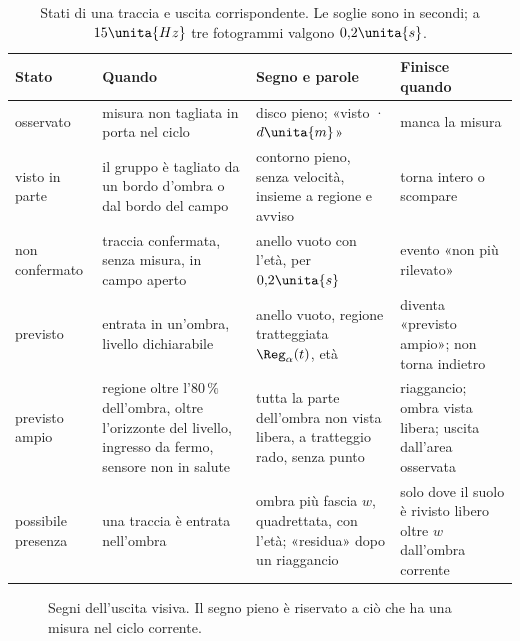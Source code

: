 \begin{table}[H]\centering\small
\caption{Stati di una traccia e uscita corrispondente. Le soglie sono in secondi; a $15\unita{Hz}$ tre fotogrammi valgono $0{,}2\unita{s}$.}\label{tab:lim-stati}
\begin{tabularx}{\linewidth}{@{}p{2.5cm}Lp{4.6cm}L@{}}
\toprule
Stato & Quando & Segno e parole & Finisce quando\\
\midrule
osservato & misura non tagliata in porta nel ciclo & disco pieno; «visto · $d\unita{m}$» & manca la misura\\
visto in parte & il gruppo è tagliato da un bordo d'ombra o dal bordo del campo & contorno pieno, senza velocità, insieme a regione e avviso & torna intero o scompare\\
non confermato & traccia confermata, senza misura, in campo aperto & anello vuoto con l'età, per $0{,}2\unita{s}$ & evento «non più rilevato»\\
previsto & entrata in un'ombra, livello dichiarabile & anello vuoto, regione tratteggiata $\Reg_\alpha(t)$, età & diventa «previsto ampio»; non torna indietro\\
previsto ampio & regione oltre l'$80\,\%$ dell'ombra, oltre l'orizzonte del livello, ingresso da fermo, sensore non in salute & tutta la parte dell'ombra non vista libera, a tratteggio rado, senza punto & riaggancio; ombra vista libera; uscita dall'area osservata\\
possibile presenza & una traccia è entrata nell'ombra & ombra più fascia $w$, quadrettata, con l'età; «residua» dopo un riaggancio & solo dove il suolo è rivisto libero oltre $w$ dall'ombra corrente\\
\bottomrule
\end{tabularx}
\end{table}

\begin{figure}[H]\centering
{}
\caption{Segni dell'uscita visiva. Il segno pieno è riservato a ciò che ha una misura nel ciclo corrente.}\label{fig:lim-segni}
\end{figure}

